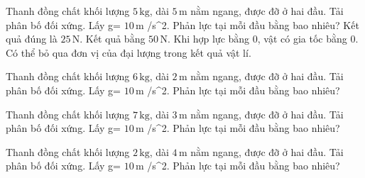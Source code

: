 \begin{ex}
Thanh đồng chất khối lượng $5\,\text{kg}$, dài $5\,\text{m}$ nằm ngang, được đỡ ở hai đầu. Tải phân bố đối xứng. Lấy g= $10\,\text{m}$ /s^2. Phản lực tại mỗi đầu bằng bao nhiêu?
\choiceTF
{\True Kết quả đúng là $25\,\text{N}$.}
{Kết quả bằng $50\,\text{N}$.}
{\True Khi hợp lực bằng 0, vật có gia tốc bằng 0.}
{Có thể bỏ qua đơn vị của đại lượng trong kết quả vật lí.}
\end{ex}

\begin{ex}
Thanh đồng chất khối lượng $6\,\text{kg}$, dài $2\,\text{m}$ nằm ngang, được đỡ ở hai đầu. Tải phân bố đối xứng. Lấy g= $10\,\text{m}$ /s^2. Phản lực tại mỗi đầu bằng bao nhiêu?
\end{ex}

\begin{ex}
Thanh đồng chất khối lượng $7\,\text{kg}$, dài $3\,\text{m}$ nằm ngang, được đỡ ở hai đầu. Tải phân bố đối xứng. Lấy g= $10\,\text{m}$ /s^2. Phản lực tại mỗi đầu bằng bao nhiêu?
\end{ex}

\begin{ex}
Thanh đồng chất khối lượng $2\,\text{kg}$, dài $4\,\text{m}$ nằm ngang, được đỡ ở hai đầu. Tải phân bố đối xứng. Lấy g= $10\,\text{m}$ /s^2. Phản lực tại mỗi đầu bằng bao nhiêu?
\end{ex}


